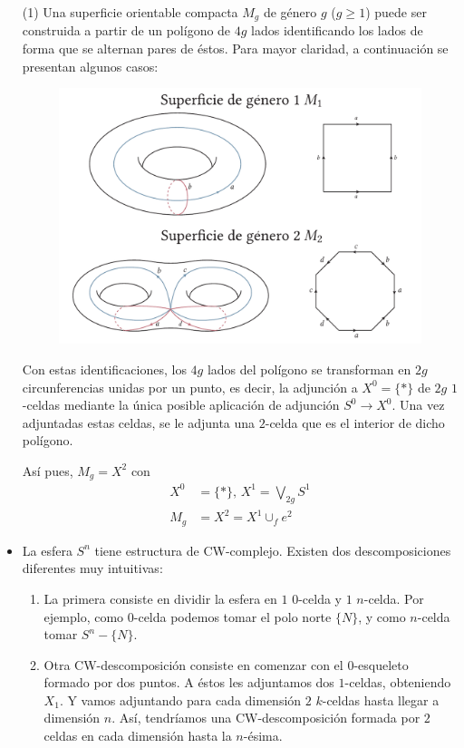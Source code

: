 \begin{ejems}
\begin{itemize}
\item[(1)] Una superficie orientable compacta $M_g$ de género $g$ ($ g \geq 1$) puede ser construida a partir de un polígono de $4g$ lados identificando los lados de forma que se alternan pares de éstos. Para mayor claridad, a continuación se presentan algunos casos: \par
\begin{figure}[h]
\centering
\includegraphics[width=\textwidth]{images/supgeng.pdf}
\end{figure} 
\par 
Con estas identificaciones, los $4g$ lados del polígono se transforman en $2g$ circunferencias unidas por un punto, es decir, la adjunción a $X^0 = \{ \ast \}$ de $2g$ $1$-celdas mediante la única posible aplicación de adjunción $S^0 \longrightarrow X^0$. Una vez adjuntadas estas celdas, se le adjunta una $2$-celda que es el interior de dicho polígono. \par
Así pues, $M_g = X^2$ con 
\begin{align*} 
X^0 &= \{ \ast \} \text{,  } X^1 = \bigvee_{2g} S^1 \\
M_g &= X^2 = X^1 \cup_f e^2
\end{align*}

\item La esfera $S^n$ tiene estructura de CW-complejo. Existen dos descomposiciones diferentes muy intuitivas: 
\begin{enumerate}
\item La primera consiste en dividir la esfera en $1$ $0$-celda y $1$ $n$-celda. Por ejemplo, como $0$-celda podemos tomar el polo norte $\{N\}$, y como $n$-celda tomar $S^n - \{N\}$.
\item Otra CW-descomposición consiste en comenzar con el $0$-esqueleto formado por dos puntos. A éstos les adjuntamos dos $1$-celdas, obteniendo $X_1$.  Y vamos adjuntando para cada dimensión $2$ $k$-celdas hasta llegar a dimensión $n$. Así, tendríamos una CW-descomposición formada por $2$ celdas en cada dimensión hasta la $n$-ésima.
\end{enumerate}


\end{itemize}
\end{ejems}
